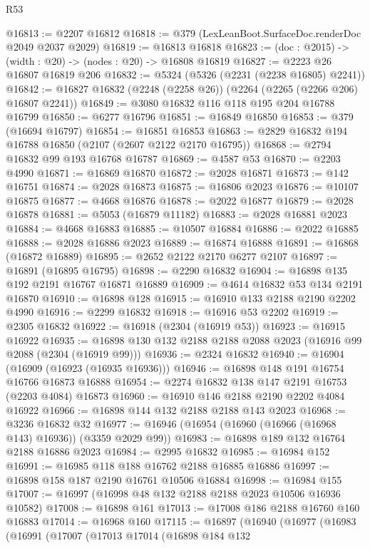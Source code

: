 \begin{lexlean}{R53}
\begin{coremodule}
@16813 := @2207 @16812
@16818 := @379 (LexLeanBoot.SurfaceDoc.renderDoc @2049 @2037 @2029)
@16819 := @16813 @16818
@16823 := (doc : @2015) -> (width : @20) -> (nodes : @20) -> @16808 @16819
@16827 := @2223 @26 @16807 @16819 @206
@16832 := @5324 (@5326 (@2231 (@2238 @16805) @2241))
@16842 := @16827 @16832 (@2248 (@2258 @26)) (@2264 (@2265 (@2266 @206) @16807 @2241))
@16849 := @3080 @16832 @116 @118 @195 @204 @16788 @16799
@16850 := @6277 @16796
@16851 := @16849 @16850
@16853 := @379 (@16694 @16797)
@16854 := @16851 @16853
@16863 := @2829 @16832 @194 @16788 @16850 (@2107 (@2607 @2122 @2170 @16795))
@16868 := @2794 @16832 @99 @193 @16768 @16787
@16869 := @4587 @53
@16870 := @2203 @4990
@16871 := @16869 @16870
@16872 := @2028 @16871
@16873 := @142 @16751
@16874 := @2028 @16873
@16875 := @16806 @2023
@16876 := @10107 @16875
@16877 := @4668 @16876
@16878 := @2022 @16877
@16879 := @2028 @16878
@16881 := @5053 (@16879 @11182)
@16883 := @2028 @16881 @2023
@16884 := @4668 @16883
@16885 := @10507 @16884
@16886 := @2022 @16885
@16888 := @2028 @16886 @2023
@16889 := @16874 @16888
@16891 := @16868 (@16872 @16889)
@16895 := @2652 @2122 @2170 @6277 @2107
@16897 := @16891 (@16895 @16795)
@16898 := @2290 @16832
@16904 := @16898 @135 @192 @2191 @16767 @16871 @16889
@16909 := @4614 @16832 @53 @134 @2191 @16870
@16910 := @16898 @128
@16915 := @16910 @133 @2188 @2190 @2202 @4990
@16916 := @2299 @16832
@16918 := @16916 @53 @2202
@16919 := @2305 @16832
@16922 := @16918 (@2304 (@16919 @53))
@16923 := @16915 @16922
@16935 := @16898 @130 @132 @2188 @2188 @2088 @2023 (@16916 @99 @2088 (@2304 (@16919 @99)))
@16936 := @2324 @16832
@16940 := @16904 (@16909 (@16923 (@16935 @16936)))
@16946 := @16898 @148 @191 @16754 @16766 @16873 @16888
@16954 := @2274 @16832 @138 @147 @2191 @16753 (@2203 @4084) @16873
@16960 := @16910 @146 @2188 @2190 @2202 @4084 @16922
@16966 := @16898 @144 @132 @2188 @2188 @143 @2023
@16968 := @3236 @16832 @32
@16977 := @16946 (@16954 (@16960 (@16966 (@16968 @143) @16936)) (@3359 @2029 @99))
@16983 := @16898 @189 @132 @16764 @2188 @16886 @2023
@16984 := @2995 @16832
@16985 := @16984 @152
@16991 := @16985 @118 @188 @16762 @2188 @16885 @16886
@16997 := @16898 @158 @187 @2190 @16761 @10506 @16884
@16998 := @16984 @155
@17007 := @16997 (@16998 @48 @132 @2188 @2188 @2023 @10506 @16936 @10582)
@17008 := @16898 @161
@17013 := @17008 @186 @2188 @16760 @160 @16883
@17014 := @16968 @160
@17115 := @16897
    (@16940
      (@16977
        (@16983
          (@16991
            (@17007
              (@17013
                @17014
                (@16898
                  @184
                  @132

\end{coremodule}
\end{lexlean}
